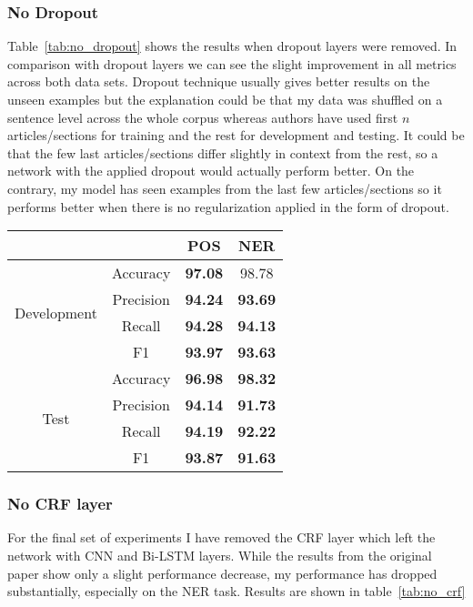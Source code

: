 \label{peculiar_dropout}
\subsubsection{No Dropout}
Table~\ref{tab:no_dropout} shows the results when dropout layers were removed.
In comparison with dropout layers we can see the slight improvement in all
metrics across both data sets. Dropout technique usually gives better results
on the unseen examples but the explanation could be that my data was shuffled
on a sentence level across the whole corpus whereas authors have used first $n$
articles/sections for training and the rest for development and testing. It
could be that the few last articles/sections differ slightly in context from
the rest, so a network with the applied dropout would actually perform better.
On the contrary, my model has seen examples from the last few articles/sections so it
performs better when there is no regularization applied in the form of dropout.

\begin{center}
\begin{tabular}{ |c|c|c|c| }
\hline
& & {\textbf{POS}} & {\textbf{NER}}\\ \hline
\multirow{4}{*}{Development} & Accuracy & \textbf{97.08} & 98.78 \\
 & Precision & \textbf{94.24} & \textbf{93.69} \\
 & Recall & \textbf{94.28} & \textbf{94.13} \\
 & F1 & \textbf{93.97} & \textbf{93.63} \\ \hline
\multirow{4}{*}{Test} & Accuracy & \textbf{96.98} & \textbf{98.32} \\
 & Precision & \textbf{94.14} & \textbf{91.73} \\
 & Recall & \textbf{94.19} & \textbf{92.22} \\
 & F1 & \textbf{93.87} & \textbf{91.63} \\ \hline
\end{tabular}
\label{tab:no_dropout}
\end{center}

\subsubsection{No CRF layer}
For the final set of experiments I have removed the CRF layer which left the
network with CNN and Bi-LSTM layers. While the results from the original paper
show only a slight performance decrease, my performance has dropped
substantially, especially on the NER task. Results are shown in table~\ref{tab:no_crf}

